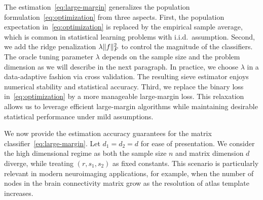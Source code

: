 \documentclass[12pt]{article}
\begin{document}
The estimation~\eqref{eq:large-margin} generalizes the population formulation~\eqref{eq:optimization} from three aspects. First, the population expectation in~\eqref{eq:optimization} is replaced by the empirical sample average, which is common in statistical learning problems with i.i.d.\ assumption. Second, we add the ridge penalization $\lambda\lVert f\rVert_F^2$ to control the magnitude of the classifiers. The oracle tuning parameter $\lambda$ depends on the sample size and the problem dimension as we will describe in the next paragraph. In practice, we choose $\lambda$ in a data-adaptive fashion via cross validation. The resulting sieve estimator enjoys numerical stability and statistical accuracy. Third, we replace the binary loss in~\eqref{eq:optimization} by a more manageable large-margin loss. This relaxation allows us to leverage efficient large-margin algorithms while maintaining desirable statistical performance under mild assumptions. 


We now provide the estimation accuracy guarantees for the matrix classifier~\eqref{eq:large-margin}. Let $d_1=d_2=d$ for ease of presentation. We consider the high dimensional regime as both the sample size $n$ and matrix dimension $d$ diverge, while treating $(r,s_1,s_2)$ as fixed constants. This scenario is particularly relevant in modern neuroimaging applications, for example, when the number of nodes in the brain connectivity matrix grow as the resolution of atlas template increases. 
\end{document}
